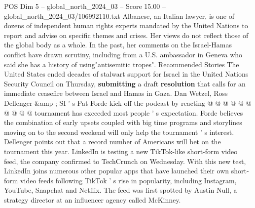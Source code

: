 \begin{textsample}{POS Dim 5 – global\_north\_2024\_03 – Score 15.00 – global\_north\_2024\_03/106992110.txt}
Albanese, an Italian lawyer, is one of dozens of independent human rights experts mandated by the United Nations to report and advise on specific themes and crises.
Her views do not reflect those of the global body as a whole.
In the past, her comments on the Israel-Hamas conflict have drawn scrutiny, including from a U.S. ambassador in Geneva who said she has a history of using"antisemitic tropes".
Recommended Stories The United States ended decades of stalwart support for Israel in the United Nations Security Council on Thursday, \textbf{submitting} a draft \textbf{resolution} that calls for an immediate ceasefire between Israel and Hamas in Gaza.
Dan Wetzel, Ross Dellenger \&amp ; SI ' s Pat Forde kick off the podcast by reacting @ @ @ @ @ @ @ @ @ @ tournament has exceeded most people ' s expectation.
Forde believes the combination of early upsets coupled with big time programs and storylines moving on to the second weekend will only help the tournament ' s interest.
Dellenger points out that a record number of Americans will bet on the tournament this year.
LinkedIn is testing a new TikTok-like short-form video feed, the company confirmed to TechCrunch on Wednesday.
With this new test, LinkedIn joins numerous other popular apps that have launched their own short-form video feeds following TikTok ' s rise in popularity, including Instagram, YouTube, Snapchat and Netflix.
The feed was first spotted by Austin Null, a strategy director at an influencer agency called McKinney.

\end{textsample}
